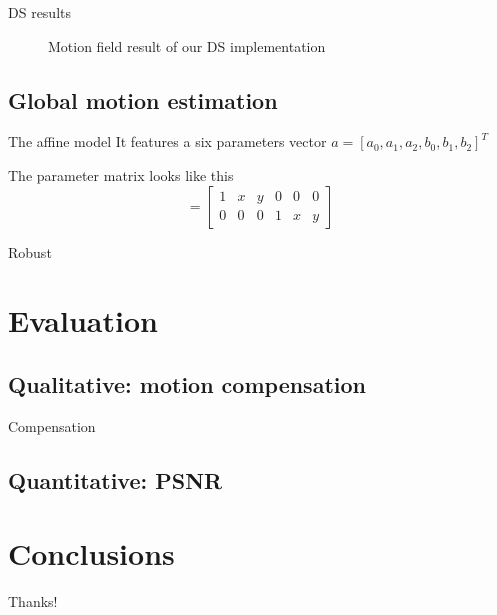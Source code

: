 \documentclass[aspectratio=1610,xcolor=dvipsnames]{beamer}
\begin{document}
\begin{frame}{DS results}
\begin{figure}[H]
\begin{minipage}[b]{0.45\textwidth}
            \label{fig:bbme-3-res}
		\end{minipage}
        \label{fig:bbme-3}
        \caption{Motion field result of our DS implementation}
	\end{figure}
\end{frame}

\subsection{Global motion estimation}
\begin{frame}{The affine model}
    It features a six parameters vector \(a = [a_0, a_1, a_2, b_0, b_1, b_2]^T\)
    \bigskip

    The parameter matrix looks like this
    \begin{equation*}
        [A(x)] = 
        \begin{bmatrix}
            1 & x & y & 0 & 0 & 0 \\
            0 & 0 & 0 & 1 & x & y
        \end{bmatrix}
    \end{equation*}
\end{frame}

\begin{frame}{Robust}
    
\end{frame}


\section{Evaluation}
\subsection{Qualitative: motion compensation}
\begin{frame}{Compensation}

\end{frame}
\subsection{Quantitative: PSNR}

\section{Conclusions}

\begin{frame}
    \begin{center}
        {\Huge\calligra Thanks!}
    \end{center}
\end{frame}
\end{document}
